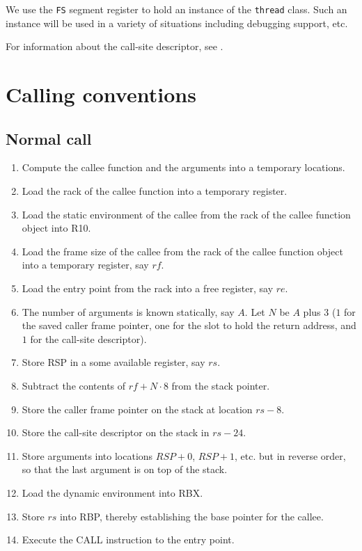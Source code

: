 We use the \texttt{FS} segment register to hold an instance of the
\texttt{thread} class.  Such an instance will be used in a variety of
situations including debugging support, etc.

For information about the call-site descriptor, see
.

\section{Calling conventions}

\subsection{Normal call}

\begin{enumerate}
\item Compute the callee function and the arguments into a temporary
  locations.
\item Load the rack of the callee function into a temporary register.
\item Load the static environment of the callee from the rack of the
  callee function object into R10.
\item Load the frame size of the callee from the rack of the callee
  function object into a temporary register, say $rf$.
\item Load the entry point from the rack into a free register, say $re$.
\item The number of arguments is known statically, say $A$.  Let $N$
  be $A$ plus $3$ ($1$ for the saved caller frame pointer, one for the
  slot to hold the return address, and $1$ for the call-site
  descriptor).
\item Store RSP in a some available register, say $rs$.
\item Subtract the contents of $rf + N \cdot 8$ from the stack
  pointer.
\item Store the caller frame pointer on the stack at location $rs -
  8$.
\item Store the call-site descriptor on the stack in $rs - 24$.
\item Store arguments into locations $RSP + 0$, $RSP + 1$, etc. but in
  reverse order, so that the last argument is on top of the stack.
\item Load the dynamic environment into RBX.
\item Store $rs$ into RBP, thereby establishing the base pointer
  for the callee.
\item Execute the CALL instruction to the entry point.
\end{enumerate}

